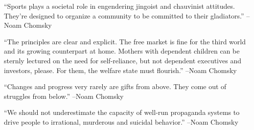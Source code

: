\documentclass{article}%
\begin{document}
\linebreak%
\vspace{1mm}%
\begin{minipage}{\textwidth}%
\flushleft%
“Sports plays a societal role in engendering jingoist and chauvinist attitudes. They're designed to organize a community to be committed to their gladiators.”%
\linebreak%
\vspace{1mm}%
–Noam Chomsky%
\linebreak%
\vspace{1mm}%
\end{minipage}%
\linebreak%
\vspace{1mm}%
\begin{minipage}{\textwidth}%
\flushleft%
“The principles are clear and explicit. The free market is fine for the third world and its growing counterpart at home. Mothers with dependent children can be sternly lectured on the need for self{-}reliance, but not dependent executives and investors, please. For them, the welfare state must flourish.”%
\linebreak%
\vspace{1mm}%
–Noam Chomsky%
\linebreak%
\vspace{1mm}%
\end{minipage}%
\linebreak%
\vspace{1mm}%
\begin{minipage}{\textwidth}%
\flushleft%
“Changes and progress very rarely are gifts from above. They come out of struggles from below.”%
\linebreak%
\vspace{1mm}%
–Noam Chomsky%
\linebreak%
\vspace{1mm}%
\end{minipage}%
\linebreak%
\vspace{1mm}%
\begin{minipage}{\textwidth}%
\flushleft%
“We should not underestimate the capacity of well{-}run propaganda systems to drive people to irrational, murderous and suicidal behavior.”%
\linebreak%
\vspace{1mm}%
–Noam Chomsky%
\linebreak%
\vspace{1mm}%
\end{minipage}%
\linebreak%
\end{document}
